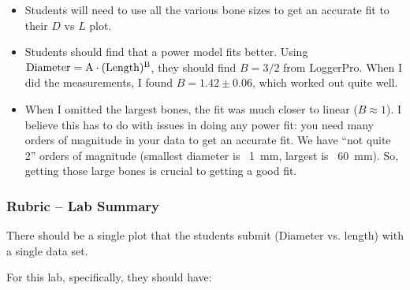 \documentclass[fleqn,letterpaper]{article}
\begin{document}
\begin{itemize}
{\begin{itemize}
  \item{Students will need to use all the various bone sizes to get an accurate fit to their $D$ vs $L$ plot.}
  \item{Students should find that a power model fits better.  Using $\rm{Diameter} = A\cdot(\rm{Length})^B$, they should find $B = 3/2$ from LoggerPro.  When I did the measurements, I found $B = 1.42 \pm 0.06$, which worked out quite well.}
  \item{When I omitted the largest bones, the fit was much closer to linear ($B \approx 1$).  I believe this has to do with issues in doing any power fit: you need many orders of magnitude in your data to get an accurate fit.  We have ``not quite 2'' orders of magnitude (smallest diameter is ~1~mm, largest is ~60~mm).  So, getting those large bones is crucial to getting a good fit.}
  \end{itemize}}
\end{itemize}

\subsubsection*{Rubric -- Lab Summary}

There should be a single plot that the students submit (Diameter vs. length) with a single data set.

For this lab, specifically, they should have:
\end{document}
